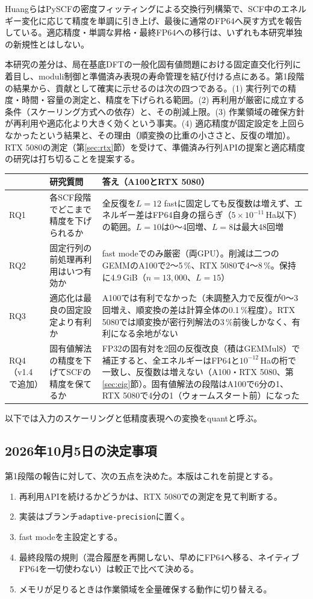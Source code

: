 \documentclass[a4paper,11pt]{ltjsarticle}
\newcommand{\code}[1]{\texttt{#1}}
\newcommand{\E}[1]{\times10^{#1}}
\begin{document}
HuangらはPySCFの密度フィッティングによる交換行列構築で、SCF中のエネルギー変化に応じて精度を単調に引き上げ、最後に通常のFP64へ戻す方式を報告している\cite{huang}。適応精度・単調な昇格・最終FP64への移行は、いずれも本研究単独の新規性とはしない。

本研究の差分は、局在基底DFTの一般化固有値問題における固定直交化行列に着目し、moduli制御と準備済み表現の寿命管理を結び付ける点にある。第1段階の結果から、貢献として確実に示せるのは次の四つである。(1) 実行列での精度・時間・容量の測定と、精度を下げられる範囲。(2) 再利用が厳密に成立する条件（スケーリング方式への依存）と、その削減上限。(3) 作業領域の確保方針が再利用や適応化より大きく効くという事実。(4) 適応精度が固定設定を上回らなかったという結果と、その理由（順変換の比重の小ささと、反復の増加）。RTX 5080の測定（第\ref{sec:rtx}節）を受けて、準備済み行列APIの提案と適応精度の研究は打ち切ることを提案する。

\noindent\begin{tabularx}{\linewidth}{@{}p{11mm}L{47mm}Y@{}}
\toprule
 & 研究質問 & 答え（A100とRTX 5080）\\
\midrule
RQ1 & 各SCF段階でどこまで精度を下げられるか & 全反復を$L=12$ fastに固定しても反復数は増えず、エネルギー差はFP64自身の揺らぎ（$5\E{-11}$\,Ha以下）の範囲。$L=10$は0〜4回増、$L=8$は最大48回増\\
RQ2 & 固定行列の前処理再利用はいつ有効か & fast modeでのみ厳密（両GPU）。削減は二つのGEMMのA100で2〜5\,\%、RTX 5080で4〜8\,\%。保持に4.9\,GiB（$n=13{,}000$、$L=15$）\\
RQ3 & 適応化は最良の固定設定より有利か & A100では有利でなかった（未調整入力で反復が0〜3回増え、順変換の差は計算全体の0.1\,\%程度）。RTX 5080では順変換が密行列解法の3\,\%前後しかなく、有利になる余地がない\\
RQ4（v1.4で追加） & 固有値解法の精度を下げてSCFの精度を保てるか & FP32の固有対を2回の反復改良（積はGEMMul8）で補正すると、全エネルギーはFP64と$10^{-12}$\,Haの桁で一致し、反復数は増えない（A100・RTX 5080、第\ref{sec:eig}節）。固有値解法の段階はA100で6分の1、RTX 5080で4分の1（ウォームスタート前）になった\\
\bottomrule
\end{tabularx}

以下では入力のスケーリングと低精度表現への変換をquantと呼ぶ。

\subsection{2026年10月5日の決定事項}
第1段階の報告に対して、次の五点を決めた。本版はこれを前提とする。
\begin{enumerate}
\item 再利用APIを続けるかどうかは、RTX 5080での測定を見て判断する。
\item 実装はブランチ\code{adaptive-precision}に置く。
\item fast modeを主設定とする。
\item 最終段階の規則（混合履歴を再開しない、早めにFP64へ移る、ネイティブFP64を一切使わない）は較正で比べて決める。
\item メモリが足りるときは作業領域を全量確保する動作に切り替える。
\end{enumerate}
\end{document}
